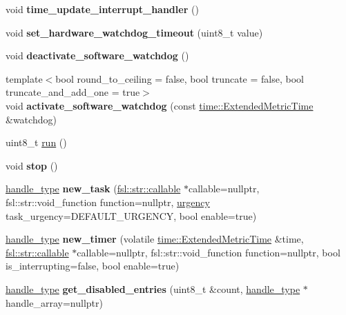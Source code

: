 \begin{DoxyCompactItemize}
void {\bfseries time\+\_\+update\+\_\+interrupt\+\_\+handler} ()
\item 
\mbox{\label{classfsl_1_1os_1_1scheduler_ac82e2622d681965a2d3078e9aae301b1}} 
void {\bfseries set\+\_\+hardware\+\_\+watchdog\+\_\+timeout} (uint8\+\_\+t value)
\item 
\mbox{\label{classfsl_1_1os_1_1scheduler_a733686bd21d0a256fae72aa8039622a5}} 
void {\bfseries deactivate\+\_\+software\+\_\+watchdog} ()
\item 
\mbox{\label{classfsl_1_1os_1_1scheduler_a5b108fc61b31230bfc4caa8c7651609f}} 
{\footnotesize template$<$bool round\+\_\+to\+\_\+ceiling = false, bool truncate = false, bool truncate\+\_\+and\+\_\+add\+\_\+one = true$>$ }\\void {\bfseries activate\+\_\+software\+\_\+watchdog} (const \mbox{\hyperlink{classtime_1_1_extended_metric_time}{time\+::\+Extended\+Metric\+Time}} \&watchdog)
\item 
uint8\+\_\+t \mbox{\hyperlink{classfsl_1_1os_1_1scheduler_ad707134d03e2028eb598bac3432564a0}{run}} ()
\item 
\mbox{\label{classfsl_1_1os_1_1scheduler_a7038d9fb21d10bbb2f4d69c96f540b95}} 
void {\bfseries stop} ()
\item 
\mbox{\label{classfsl_1_1os_1_1scheduler_ab963de59e9610f0bcb2e08bc9591a2c2}} 
\mbox{\hyperlink{classfsl_1_1lg_1_1range__int}{handle\+\_\+type}} {\bfseries new\+\_\+task} (\mbox{\hyperlink{classfsl_1_1str_1_1callable}{fsl\+::str\+::callable}} $\ast$callable=nullptr, fsl\+::str\+::void\+\_\+function function=nullptr, \mbox{\hyperlink{classfsl_1_1os_1_1urgency}{urgency}} task\+\_\+urgency=D\+E\+F\+A\+U\+L\+T\+\_\+\+U\+R\+G\+E\+N\+CY, bool enable=true)
\item 
\mbox{\label{classfsl_1_1os_1_1scheduler_a4c536ace786851c65fa15dd2e7a8fe85}} 
\mbox{\hyperlink{classfsl_1_1lg_1_1range__int}{handle\+\_\+type}} {\bfseries new\+\_\+timer} (volatile \mbox{\hyperlink{classtime_1_1_extended_metric_time}{time\+::\+Extended\+Metric\+Time}} \&time, \mbox{\hyperlink{classfsl_1_1str_1_1callable}{fsl\+::str\+::callable}} $\ast$callable=nullptr, fsl\+::str\+::void\+\_\+function function=nullptr, bool is\+\_\+interrupting=false, bool enable=true)
\item 
\mbox{\label{classfsl_1_1os_1_1scheduler_a7594c7f7871cccb1b98877b1c8271ff1}} 
\mbox{\hyperlink{classfsl_1_1lg_1_1range__int}{handle\+\_\+type}} {\bfseries get\+\_\+disabled\+\_\+entries} (uint8\+\_\+t \&count, \mbox{\hyperlink{classfsl_1_1lg_1_1range__int}{handle\+\_\+type}} $\ast$handle\+\_\+array=nullptr)
\end{DoxyCompactItemize}

